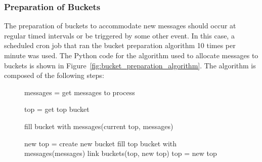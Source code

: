 \documentclass{article}
\begin{document}
\subsubsection{Preparation of Buckets} %
\label{ssub:preparation_of_buckets}

The preparation of buckets to accommodate new messages should occur at regular timed intervals or be triggered by some other event. In this case, a scheduled cron job that ran the bucket preparation algorithm 10 times per minute was used. The Python code for the algorithm used to allocate messages to buckets is shown in Figure~\ref{fig:bucket_preparation_algorithm}. The algorithm is composed of the following steps:

\begin{figure}
\begin{center}
\begin{minipage}{5.5in}%
\label{fig:message_processing_pseudocode}
\begin{algorithmic}
\STATE messages = get messages to process

\STATE top = get top bucket

\STATE fill bucket with messages(current top, messages)

	\STATE new top = create new bucket
	\STATE fill top bucket with messages(messages)
	\STATE link buckets(top, new top)
	\STATE top = new top
\ENDWHILE
\end{algorithmic}
\end{minipage}
\end{center}
\end{figure}
\end{document}
